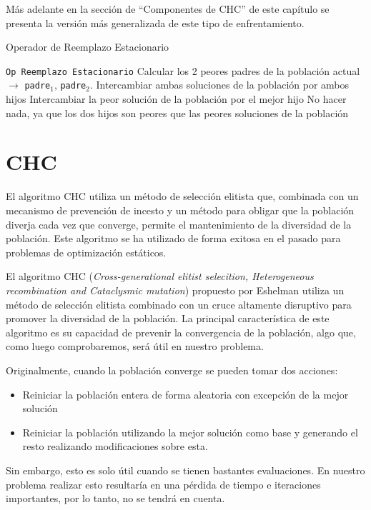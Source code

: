 Más adelante en la sección de ``Componentes de CHC'' de este capítulo se presenta la versión más generalizada de este tipo de enfrentamiento.

\begin{algorithm}
\caption{Operador de Reemplazo Estacionario}\label{alg:ORE}
\begin{algorithmic}[1]
\Procedure \texttt{Op Reemplazo Estacionario}
\State Calcular los 2 peores padres de la población actual $\xrightarrow{}{}$ \texttt{padre$_1$}, \texttt{padre$_2$}.
	\State Intercambiar ambas soluciones de la población por ambos hijos
	\State Intercambiar la peor solución de la población por el mejor hijo
\Else
	\State No hacer nada, ya que los dos hijos son peores que las peores soluciones de la población
\EndIf
\EndProcedure
\end{algorithmic}
\end{algorithm}

\section{CHC}

El algoritmo CHC utiliza un método de selección elitista que, combinada con un mecanismo de prevención de incesto y un método para obligar que la población diverja cada vez que converge, permite el mantenimiento de la diversidad de la población. 
Este algoritmo se ha utilizado de forma exitosa en el pasado para problemas de optimización estáticos. 

El algoritmo CHC (\textit{Cross-generational elitist selecition, Heterogeneous recombination and Cataclysmic mutation}) propuesto por Eshelman utiliza un método de selección elitista  combinado con un cruce altamente disruptivo para promover la diversidad de la población. 
La principal característica de este algoritmo es su capacidad de prevenir la convergencia de la población, algo que, como luego comprobaremos, será útil en nuestro problema. 


Originalmente, cuando la población converge se pueden tomar dos acciones:
\begin{itemize}
	\item Reiniciar la población entera de forma aleatoria con excepción de la mejor solución
	\item Reiniciar la población utilizando la mejor solución como base y generando el resto realizando modificaciones sobre esta.
\end{itemize}
Sin embargo, esto es solo útil cuando se tienen bastantes evaluaciones. 
En nuestro problema realizar esto resultaría en una pérdida de tiempo e iteraciones importantes, por lo tanto, no se tendrá en cuenta. 

